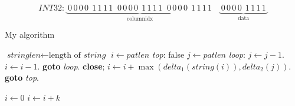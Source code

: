\[
  INT32: \underbrace{\;0\,0\,0\,0\:\:1\,1\,1\,1\;\;0\,0\,0\,0\:\:1\,1\,1\,1\;\;0\,0\,0\,0\:\:1\,1\,1\,1\;}_\text{columnidx}\;\;\underbrace{\;0\,0\,0\,0\:\:1\,1\,1\,1\;}_\text{data} 
\]


\newpage
\begin{algorithm}
\caption{My algorithm}\label{euclid}
\begin{algorithmic}[1]
\State $\textit{stringlen} \gets \text{length of }\textit{string}$
\State $i \gets \textit{patlen}$
\BState \emph{top}:
 \Return false
\EndIf
\State $j \gets \textit{patlen}$
\BState \emph{loop}:
\State $j \gets j-1$.
\State $i \gets i-1$.
\State \textbf{goto} \emph{loop}.
\State \textbf{close};
\EndIf
\State $i \gets i+\max(\textit{delta}_1(\textit{string}(i)),\textit{delta}_2(j))$.
\State \textbf{goto} \emph{top}.
\EndProcedure
\end{algorithmic}
\end{algorithm}

\begin{algorithmic}
    \State $i\gets 0$
\Else
        \State $i\gets i+k$
    \EndIf
\EndIf
\end{algorithmic}